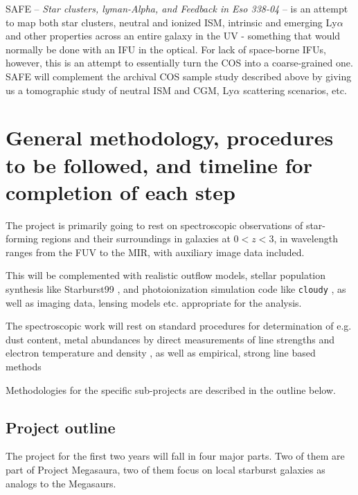 \documentclass[12pt]{amsart}
\begin{document}
SAFE -- \emph{Star clusters, lyman-Alpha, and Feedback in Eso 338-04} -- is an
attempt to map both star clusters, neutral and ionized ISM, intrinsic and
emerging Ly$\alpha$ and other properties across an entire galaxy in the UV -
something that would normally be done with an IFU in the optical. For lack of
space-borne IFUs, however, this is an attempt to essentially turn the COS into a
coarse-grained one. SAFE will complement the archival COS sample study described
above by giving us a tomographic study of neutral ISM and CGM, Ly$\alpha$
scattering scenarios, etc.

\section{General methodology, procedures to be followed, and timeline for 
completion of each step}

The project is primarily going to rest on spectroscopic observations of
star-forming regions and their surroundings in galaxies at $0 < z < 3$, in
wavelength ranges from the FUV to the MIR, with auxiliary image data included.

This will be complemented with realistic outflow models, stellar population
synthesis like Starburst99 \citep[][and citations therein]{Leitherer2014}, and
photoionization simulation code like \texttt{cloudy} \citep{Ferland2013}, as well
as imaging data, lensing models etc. appropriate for the analysis. 

The spectroscopic work will rest on standard procedures for determination of
e.g. dust content, metal abundances by direct measurements of line strengths and
electron temperature and density \citep[See e.g.][]{Osterbrock}, as well as
empirical, strong line based methods \citep[e.g.][]{YMarino2013}

Methodologies for the specific sub-projects are described in the outline below. 


\subsection{Project outline}

The project for the first two years will fall in four major parts. Two of them
are part of Project Megasaura, two of them focus on local starburst galaxies
as analogs to the Megasaurs.
\end{document}
